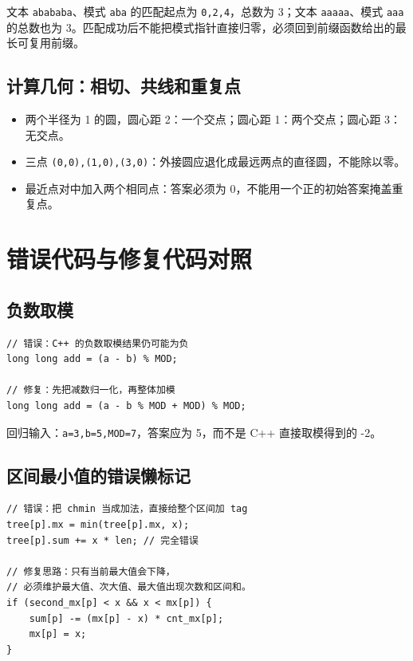 \documentclass[UTF8,openany,oneside,zihao=-4]{ctexbook}
\begin{document}
文本 \lstinline|abababa|、模式 \lstinline|aba| 的匹配起点为 \lstinline|0,2,4|，总数为 3；文本 \lstinline|aaaaa|、模式 \lstinline|aaa| 的总数也为 3。匹配成功后不能把模式指针直接归零，必须回到前缀函数给出的最长可复用前缀。

\subsection{计算几何：相切、共线和重复点}

\begin{itemize}
  \item 两个半径为 1 的圆，圆心距 2：一个交点；圆心距 1：两个交点；圆心距 3：无交点。
  \item 三点 \lstinline|(0,0),(1,0),(3,0)|：外接圆应退化成最远两点的直径圆，不能除以零。
  \item 最近点对中加入两个相同点：答案必须为 0，不能用一个正的初始答案掩盖重复点。
\end{itemize}

\section{错误代码与修复代码对照}

\subsection{负数取模}

\begin{lstlisting}
// 错误：C++ 的负数取模结果仍可能为负
long long add = (a - b) % MOD;

// 修复：先把减数归一化，再整体加模
long long add = (a - b % MOD + MOD) % MOD;
\end{lstlisting}

回归输入：\lstinline|a=3,b=5,MOD=7|，答案应为 5，而不是 C++ 直接取模得到的 -2。

\subsection{区间最小值的错误懒标记}

\begin{lstlisting}
// 错误：把 chmin 当成加法，直接给整个区间加 tag
tree[p].mx = min(tree[p].mx, x);
tree[p].sum += x * len; // 完全错误

// 修复思路：只有当前最大值会下降，
// 必须维护最大值、次大值、最大值出现次数和区间和。
if (second_mx[p] < x && x < mx[p]) {
    sum[p] -= (mx[p] - x) * cnt_mx[p];
    mx[p] = x;
}
\end{lstlisting}
\end{document}
